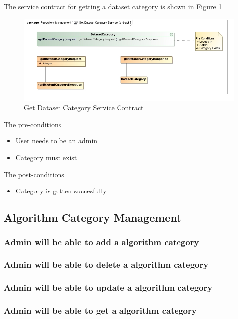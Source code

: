 The service contract for getting a dataset category is shown in Figure \ref{fig:getDatasetCatService}
\begin{figure}[H]
  \begin{center}
  \includegraphics[scale=0.6]{../Diagrams and Charts/Test Data/Get Dataset Category Service Contract.jpg}
  \caption{Get Dataset Category Service Contract}
  \end{center}
  \label{fig:getDatasetCatService}
\end{figure}

The pre-conditions
\begin{itemize}
  \item User needs to be an admin
  \item Category must exist
\end{itemize}

The post-conditions
\begin{itemize}
  \item Category is gotten succesfully
\end{itemize}

\subsection{Algorithm Category Management}

\subsubsection {Admin will be able to add a algorithm category}
\subsubsection {Admin will be able to delete a algorithm category}
\subsubsection {Admin will be able to update a algorithm category}
\subsubsection {Admin will be able to get a algorithm category}







